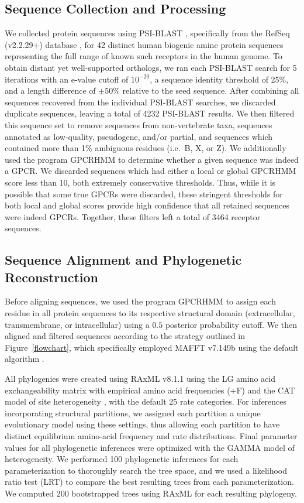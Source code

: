 \documentclass[fleqn,10pt]{wlpeerj}
\begin{document}
\subsection*{Sequence Collection and Processing}
We collected protein sequences using PSI-BLAST \citep{psiblast}, specifically from the RefSeq (v2.2.29+) database \citep{refseq}, for 42 distinct human biogenic amine protein sequences representing the full range of known such receptors in the human genome. To obtain distant yet well-supported orthologs, we ran each PSI-BLAST search for 5 iterations with an e-value cutoff of $10^{-20}$, a sequence identity threshold of 25\%, and a length difference of $\pm50$\% relative to the seed sequence. After combining all sequences recovered from the individual PSI-BLAST searches, we discarded duplicate sequences, leaving a total of 4232 PSI-BLAST results. We then filtered this sequence set to remove sequences from non-vertebrate taxa, sequences annotated as low-quality, pseudogene, and/or partial, and sequences which contained more than 1\% ambiguous residues (i.e.\ B, X, or Z). We additionally used the program GPCRHMM \citep{Wistrand2006} to determine whether a given sequence was indeed a GPCR. We discarded sequences which had either a local or global GPCRHMM score less than 10, both extremely conservative thresholds. Thus, while it is possible that some true GPCRs were discarded, these stringent thresholds for both local and global scores provide high confidence that all retained sequences were indeed GPCRs. Together, these filters left a total of 3464 receptor sequences.


\subsection*{Sequence Alignment and Phylogenetic Reconstruction}
Before aligning sequences, we used the program GPCRHMM \citep{Wistrand2006} to assign each residue in all protein sequences to its respective structural domain (extracellular, transmembrane, or intracellular) using a $0.5$ posterior probability cutoff. We then aligned and filtered sequences according to the strategy outlined in Figure~\ref{flowchart}, which specifically employed MAFFT v7.149b using the default algorithm \citep{mafftv7}. 

All phylogenies were created using RAxML v8.1.1 \citep{raxml} using the LG \citep{LG} amino acid exchangeability matrix with empirical amino acid frequencies (+F) and the CAT model of site heterogeneity \citep{Stamatakis2006}, with the default 25 rate categories. For inferences incorporating structural partitions, we assigned each partition a unique evolutionary model using these settings, thus allowing each partition to have distinct equilibrium amino-acid frequency and rate distributions. Final parameter values for all phylogenetic inferences were optimized with the GAMMA model of heterogeneity. We performed 100 phylogenetic inferences for each parameterization to thoroughly search the tree space, and we used a likelihood ratio test (LRT) to compare the best resulting trees from each parameterization. We computed 200 bootstrapped trees using RAxML for each resulting phylogeny.
\end{document}
